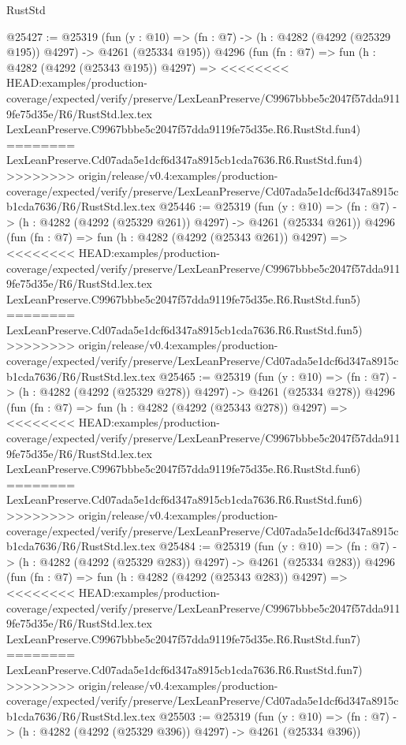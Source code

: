 \begin{lexlean}{RustStd}
\begin{coremodule}
{\begin{coremodule}
{{{{{{{{{{{{{{{{{{{{{{{{{{{{{{{{{{{@25427 := @25319
    (fun (y : @10) => (fn : @7) -> (h : @4282 (@4292 (@25329 @195)) @4297) -> @4261 (@25334 @195))
    @4296
    (fun (fn : @7) =>
    fun (h : @4282 (@4292 (@25343 @195)) @4297) =>
<<<<<<<< HEAD:examples/production-coverage/expected/verify/preserve/LexLeanPreserve/C9967bbbe5c2047f57dda9119fe75d35e/R6/RustStd.lex.tex
    LexLeanPreserve.C9967bbbe5c2047f57dda9119fe75d35e.R6.RustStd.fun4)
========
    LexLeanPreserve.Cd07ada5e1dcf6d347a8915cb1cda7636.R6.RustStd.fun4)
>>>>>>>> origin/release/v0.4:examples/production-coverage/expected/verify/preserve/LexLeanPreserve/Cd07ada5e1dcf6d347a8915cb1cda7636/R6/RustStd.lex.tex
@25446 := @25319
    (fun (y : @10) => (fn : @7) -> (h : @4282 (@4292 (@25329 @261)) @4297) -> @4261 (@25334 @261))
    @4296
    (fun (fn : @7) =>
    fun (h : @4282 (@4292 (@25343 @261)) @4297) =>
<<<<<<<< HEAD:examples/production-coverage/expected/verify/preserve/LexLeanPreserve/C9967bbbe5c2047f57dda9119fe75d35e/R6/RustStd.lex.tex
    LexLeanPreserve.C9967bbbe5c2047f57dda9119fe75d35e.R6.RustStd.fun5)
========
    LexLeanPreserve.Cd07ada5e1dcf6d347a8915cb1cda7636.R6.RustStd.fun5)
>>>>>>>> origin/release/v0.4:examples/production-coverage/expected/verify/preserve/LexLeanPreserve/Cd07ada5e1dcf6d347a8915cb1cda7636/R6/RustStd.lex.tex
@25465 := @25319
    (fun (y : @10) => (fn : @7) -> (h : @4282 (@4292 (@25329 @278)) @4297) -> @4261 (@25334 @278))
    @4296
    (fun (fn : @7) =>
    fun (h : @4282 (@4292 (@25343 @278)) @4297) =>
<<<<<<<< HEAD:examples/production-coverage/expected/verify/preserve/LexLeanPreserve/C9967bbbe5c2047f57dda9119fe75d35e/R6/RustStd.lex.tex
    LexLeanPreserve.C9967bbbe5c2047f57dda9119fe75d35e.R6.RustStd.fun6)
========
    LexLeanPreserve.Cd07ada5e1dcf6d347a8915cb1cda7636.R6.RustStd.fun6)
>>>>>>>> origin/release/v0.4:examples/production-coverage/expected/verify/preserve/LexLeanPreserve/Cd07ada5e1dcf6d347a8915cb1cda7636/R6/RustStd.lex.tex
@25484 := @25319
    (fun (y : @10) => (fn : @7) -> (h : @4282 (@4292 (@25329 @283)) @4297) -> @4261 (@25334 @283))
    @4296
    (fun (fn : @7) =>
    fun (h : @4282 (@4292 (@25343 @283)) @4297) =>
<<<<<<<< HEAD:examples/production-coverage/expected/verify/preserve/LexLeanPreserve/C9967bbbe5c2047f57dda9119fe75d35e/R6/RustStd.lex.tex
    LexLeanPreserve.C9967bbbe5c2047f57dda9119fe75d35e.R6.RustStd.fun7)
========
    LexLeanPreserve.Cd07ada5e1dcf6d347a8915cb1cda7636.R6.RustStd.fun7)
>>>>>>>> origin/release/v0.4:examples/production-coverage/expected/verify/preserve/LexLeanPreserve/Cd07ada5e1dcf6d347a8915cb1cda7636/R6/RustStd.lex.tex
@25503 := @25319
    (fun (y : @10) => (fn : @7) -> (h : @4282 (@4292 (@25329 @396)) @4297) -> @4261 (@25334 @396))
}}}}}}}}}}}}}}}}}}}}}}}}}}}}}}}}}}}
\end{coremodule}}
\end{coremodule}
\end{lexlean}
